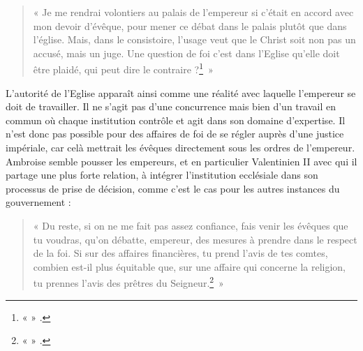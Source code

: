 \bigskip

\begin{quote}
    « Je me rendrai volontiers au palais de l’empereur si c’était en accord avec mon devoir d’évêque, pour mener ce débat dans le palais plutôt que dans l’église. Mais, dans le consistoire, l’usage veut que le Christ soit non pas un accusé, mais un juge. Une question de foi c’est dans l’Eglise qu’elle doit être plaidé, qui peut dire le contraire ?\footnote{«  » \cite[\nopp 75A,3]{ambroise_lettres}.}~»
\end{quote}

\bigskip

L’autorité de l’Eglise apparaît ainsi comme une réalité avec laquelle l’empereur se doit de travailler. Il ne s’agit pas d’une concurrence mais bien d’un travail en commun où chaque institution contrôle et agit dans son domaine d’expertise. Il n’est donc pas possible pour des affaires de foi de se régler auprès d’une justice impériale, car celà mettrait les évêques directement sous les ordres de l’empereur. Ambroise semble pousser les empereurs, et en particulier Valentinien II avec qui il partage une plus forte relation, à intégrer l’institution ecclésiale dans son processus de prise de décision, comme c’est le cas pour les autres instances du gouvernement :

\bigskip

\begin{quote}
    « Du reste, si on ne me fait pas assez confiance, fais venir les évêques que tu voudras, qu’on débatte, empereur, des mesures à prendre dans le respect de la foi. Si sur des affaires financières, tu prend l’avis de tes comtes, combien est-il plus équitable que, sur une affaire qui concerne la religion, tu prennes l’avis des prêtres du Seigneur.\footnote{«  » \cite[,27]{ambroise_lettres}.}~»
\end{quote}

\bigskip

